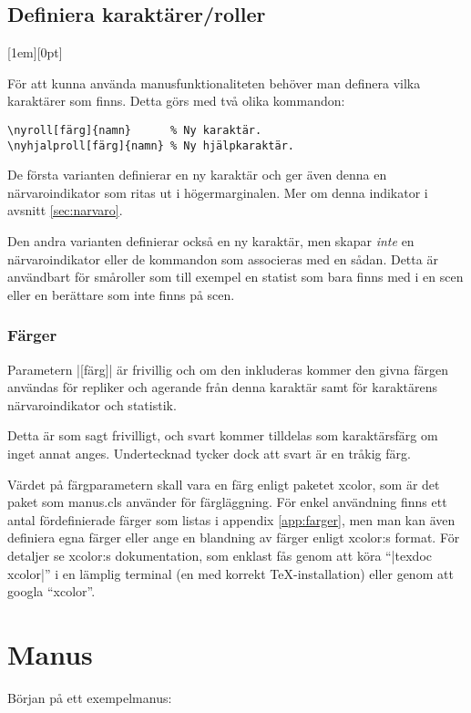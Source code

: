 \documentclass[a4paper,12pt]{article}
\newcommand*{\pack}{\textsf}
\newcommand\funnybone[1]{%
	\raisebox{1em}[1em][0pt]{%
		\makebox[\textwidth][r]{\large\it eller, ``#1''}%
	}%
}
\begin{document}
\subsection{Definiera karaktärer/roller}
\label{sec:nyroll}
\funnybone{Våra tävlande är...}
För att kunna använda manusfunktionaliteten behöver man definera vilka karaktärer som finns. Detta görs med två olika kommandon:

\begin{lstlisting}
\nyroll[färg]{namn}      % Ny karaktär.
\nyhjalproll[färg]{namn} % Ny hjälpkaraktär.
\end{lstlisting}

De första varianten definierar en ny karaktär och ger även denna en närvaroindikator som ritas ut i högermarginalen. Mer om denna indikator i avsnitt \ref{sec:narvaro}.

Den andra varianten definierar också en ny karaktär, men skapar \emph{inte} en närvaroindikator eller de kommandon som associeras med en sådan. Detta är användbart för småroller som till exempel en statist som bara finns med i en scen eller en berättare som inte finns på scen.

\subsubsection{Färger}
\label{sec:farger}
Parametern |[färg]| är frivillig och om den inkluderas kommer den givna färgen användas för repliker och agerande från denna karaktär samt för karaktärens närvaroindikator och statistik.

Detta är som sagt frivilligt, och svart kommer tilldelas som karaktärsfärg om inget annat anges. Undertecknad tycker dock att svart är en tråkig färg.

Värdet på färgparametern skall vara en färg enligt paketet \pack{xcolor}, som är det paket som \pack{manus.cls} använder för färgläggning. För enkel användning finns ett antal fördefinierade färger som listas i appendix \ref{app:farger}, men man kan även definiera egna färger eller ange en blandning av färger enligt \pack{xcolor}:s format. För detaljer se \pack{xcolor}:s dokumentation, som enklast fås genom att köra ``|texdoc xcolor|'' i en lämplig terminal (en med korrekt \TeX-installation) eller genom att googla ``xcolor''.



\needspace{5em}
\section{Manus}
Början på ett exempelmanus:
\end{document}
